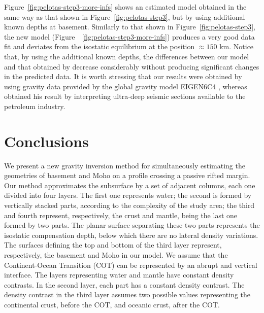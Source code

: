 \documentclass[manuscript]{geophysics}
\begin{document}
Figure~\ref{fig:pelotas-step3-more-infs} shows an estimated model
obtained in the same way as that shown in Figure~\ref{fig:pelotas-step3},
but by using additional known depths at basement.
Similarly to that shown in Figure~\ref{fig:pelotas-step3},
the new model (Figure~~\ref{fig:pelotas-step3-more-infs}) produces a very good data fit 
and deviates from the isostatic equilibrium at the position $\approx 150$ km. 
Notice that, by using the additional known depths, the differences between our model
and that obtained by \citet{zalan2015} decrease considerably without producing
significant changes in the predicted data.
It is worth stressing that our results were obtained by using gravity data
provided by the global gravity model EIGEN6C4 \citep{forste2014}, whereas 
\citet{zalan2015} obtained his result by interpreting ultra-deep seismic sections
available to the petroleum industry.


\section{Conclusions}

We present a new gravity inversion method for simultaneously estimating the 
geometries of basement and Moho on a profile crossing a passive rifted margin.
Our method approximates the subsurface by a set of adjacent columns, each one divided
into four layers. The first one represents water; the second is formed by vertically
stacked parts, according to the complexity of the study area; the third and fourth represent,
respectively, the crust and mantle, being the last one formed by two parts.
The planar surface separating these two parts represents the isostatic compensation depth,
below which there are no lateral density variations.
The surfaces defining the top and bottom of the third layer represent, respectively, 
the basement and Moho in our model.
We assume that the Continent-Ocean Transition (COT) can be represented by an abrupt and 
vertical interface.
The layers representing water and mantle have constant density contrasts.
In the second layer, each part has a constant density contrast.
The density contrast in the third layer assumes two possible values representing
the continental crust, before the COT, and oceanic crust, after the COT.
\end{document}

